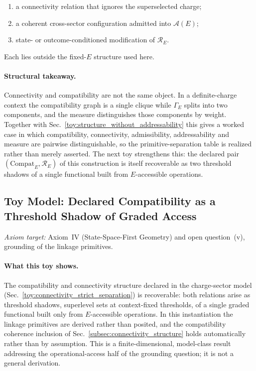 \documentclass[aps,prx,onecolumn,11pt]{revtex4-2}
\theoremstyle{plain}
\theoremstyle{definition}
\theoremstyle{remark}
\begin{document}
\begin{enumerate}[label=(\alph*), leftmargin=2.2em]
\item a connectivity relation that ignores the superselected charge;
\item a coherent cross-sector configuration admitted into \(\mathcal A(E)\);
\item state- or outcome-conditioned modification of \(\mathcal R_E\).
\end{enumerate}

Each lies outside the fixed-\(E\) structure used here.

\paragraph{Structural takeaway.}

Connectivity and compatibility are not the same object. In a definite-charge
context the compatibility graph is a single clique while \(\Gamma_E\)
splits into two components, and the measure distinguishes those
components by weight. Together with
Sec.~\ref{toy:structure_without_addressability} this gives a
worked case in which compatibility, connectivity, admissibility,
addressability and measure are pairwise distinguishable, so the
primitive-separation table is realized rather than merely asserted.
The next toy strengthens this: the declared pair
\((\mathrm{Compat}_E,\mathcal R_E)\) of this construction is itself
recoverable as two threshold shadows of a single functional built from
\(E\)-accessible operations.


\subsection{Toy Model: Declared Compatibility as a Threshold Shadow of Graded Access}
\label{toy:threshold_shadow_grounding}

\noindent\emph{Axiom target:} Axiom~IV (State-Space-First Geometry) and open question~(v), grounding of the linkage primitives.

\paragraph{What this toy shows.}
The compatibility and connectivity structure declared in the
charge-sector model
(Sec.~\ref{toy:connectivity_strict_separation}) is recoverable:
both relations arise as threshold shadows, superlevel sets at
context-fixed thresholds, of a single graded functional built only from
\(E\)-accessible operations. In this instantiation the linkage
primitives are derived rather than posited, and the compatibility
coherence inclusion of
Sec.~\ref{subsec:connectivity_structure} holds automatically rather
than by assumption. This is a finite-dimensional, model-class result
addressing the operational-access half of the grounding question; it is
not a general derivation.
\end{document}
